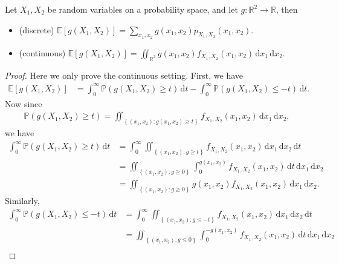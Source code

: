 \begin{proposition}
    Let \(X_1, X_2\) be random variables on a probability space, and let \(g: \mathbb{R}^2 \to \mathbb{R} \), then 
    \begin{itemize}
        \item (discrete) \(\mathbb{E} [g(X_1, X_2)] = \sum_{x_1, x_2} g(x_1, x_2) p_{X_1, X_2} (x_1, x_2)\). 
        \item (continuous) \(\mathbb{E} [g(X_1, X_2)] = \iint_{\mathbb{R} ^2} g(x_1, x_2) f_{X_1, X_2}(x_1, x_2) \, \mathrm{d} x_1 \, \mathrm{d} x_2   \).
    \end{itemize}  
\end{proposition}

\begin{proof}
    Here we only prove the continuous setting. First, we have
    \begin{align*}
        \mathbb{E} [g(X_1, X_2)] &= \int _0^{\infty} \mathbb{P} (g(X_1, X_2) \ge t) \, \mathrm{d} t - \int _0^{\infty} \mathbb{P} (g(X_1, X_2) \le -t) \, \mathrm{d} t. 
    \end{align*}
    Now since 
    \begin{align*}
        \mathbb{P} (g(X_1, X_2) \ge t) = \iint_{\left\{ (x_1, x_2): g(x_1, x_2) \ge t \right\} } f_{X_1, X_2}(x_1, x_2) \, \mathrm{d} x_1 \, \mathrm{d} x_2,  
    \end{align*}
    we have 
    \begin{align*}
        \int _0^{\infty} \mathbb{P} (g(X_1, X_2) \ge t) \, \mathrm{d} t &= \int _0^{\infty} \iint_{\left\{ (x_1, x_2): g \ge t \right\} } f_{X_1, X_2} (x_1, x_2) \, \mathrm{d} x_1 \, \mathrm{d} x_2 \, \mathrm{d} t \\
        &= \iint_{\left\{ (x_1, x_2): g \ge 0 \right\} } \int _0^{g(x_1, x_2)} f_{X_1, X_2} (x_1, x_2) \, \mathrm{d} t \, \mathrm{d} x_1 \, \mathrm{d} x_2 \\
        &= \iint_{\left\{ (x_1, x_2): g \ge 0 \right\} } g(x_1, x_2) f_{X_1, X_2}(x_1, x_2) \, \mathrm{d} x_1 \, \mathrm{d} x_2.      
    \end{align*}
    Similarly,
    \begin{align*}
        \int_0^{\infty} \mathbb{P} (g(X_1, X_2) \le -t) \, \mathrm{d} t &= \int _0^{\infty} \iint_{\left\{ (x_1, x_2): g \le -t \right\} } f_{X_1, X_2} (x_1, x_2) \, \mathrm{d} x_1 \, \mathrm{d} x_2 \, \mathrm{d} t \\
        &= \iint_{\left\{ (x_1, x_2): g \le 0 \right\} } \int _0^{-g(x_1, x_2)} f_{X_1, X_2} (x_1, x_2) \, \mathrm{d} t \, \mathrm{d} x_1 \, \mathrm{d} x_2 \\

\end{align*}
\end{proof}
